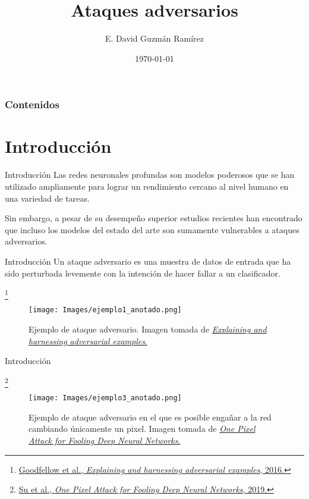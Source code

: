 \documentclass[10pt]{beamer}
\title[Ataques adversarios]{Ataques adversarios} %
\author[IIMAS, UNAM]{E. David Guzmán Ramírez} %
\institute[] %
{	Licenciatura en Ciencia de Datos \\
	Introducción al Aprendizaje Profundo \\ \medskip M. en C. Berenice Montalvo Lezama \\ M. en C. Ricardo Montalvo Lezama
}
\date{{\tiny \today}} %
\newcommand\blfootnote[1]{%
  \begingroup
  \renewcommand\thefootnote{}\footnote{#1}%
  \addtocounter{footnote}{-1}%
  \endgroup
}
\begin{document}
	
	
\begin{frame}
	\titlepage %
\end{frame}

\begin{frame}
\frametitle{Contenidos}
\justify

\tableofcontents
\end{frame}

\section{Introducción}
\begin{frame}{Introducción}
\justify
\small
Las redes neuronales profundas son modelos poderosos que se han utilizado ampliamente para lograr un rendimiento cercano al nivel humano en una variedad de tareas. \medskip

Sin embargo, a pesar de su desempeño superior estudios recientes han encontrado que incluso los modelos del estado del arte son sumamente vulnerables a ataques adversarios.
\end{frame}

\begin{frame}{Introducción}
\justify
\small
Un ataque adversario es una muestra de datos de entrada que ha sido perturbada levemente con la intención de hacer fallar a un clasificador. 

\blfootnote{\vspace*{0.3cm} \href{https://arxiv.org/pdf/1412.6572.pdf}{Goodfellow et al., \emph{Explaining and harnessing adversarial examples}, 2016.}}

\begin{figure}
\centering
\texttt{[image: Images/ejemplo1\_anotado.png]}
\caption{Ejemplo de ataque adversario. Imagen tomada de \href{https://arxiv.org/pdf/1412.6572.pdf}{\emph{Explaining and harnessing adversarial examples}.}}
\end{figure}

\end{frame}

\begin{frame}{Introducción}
\justify
\small

\blfootnote{\vspace*{0.3cm} \href{https://arxiv.org/pdf/1412.6572.pdf}{Su et al., \emph{One Pixel Attack for Fooling Deep Neural Networks}, 2019.}}

\begin{figure}
\centering
\texttt{[image: Images/ejemplo3\_anotado.png]}
\caption{Ejemplo de ataque adversario en el que es posible engañar a la red cambiando únicamente un pixel. Imagen tomada de \href{https://arxiv.org/pdf/1710.08864.pdf}{\emph{One Pixel Attack for Fooling Deep Neural Networks}.}}
\end{figure}

\end{frame}
\end{document}

